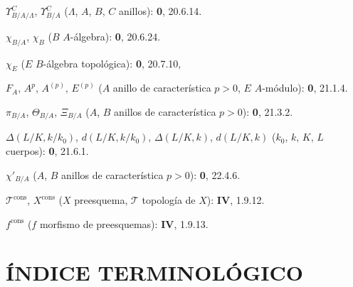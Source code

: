 \clearpage
{}
$\Upsilon^C_{B/A/\Lambda}$, $\Upsilon^C_{B/A}$ ($\Lambda$, $A$, $B$, $C$ anillos): \textbf{0}, 20.6.14.\par
$\chi_{B/A}$, $\chi_B$ ($B$ $A$-álgebra): \textbf{0}, 20.6.24.\par
$\chi_E$ ($E$ $B$-álgebra topológica): \textbf{0}, 20.7.10,\par
$F_A$, $A^p$, $A^{(p)}$, $E^{(p)}$ ($A$ anillo de característica $p>0$, $E$ $A$-módulo): \textbf{0}, 21.1.4.\par
$\pi_{B/A}$, $\Theta_{B/A}$, $\Xi_{B/A}$ ($A$, $B$ anillos de característica $p>0$): \textbf{0}, 21.3.2.\par
$\Delta(L/K,k/k_0)$, $d(L/K,k/k_0)$, $\Delta(L/K,k)$, $d(L/K,k)$ ($k_0$, $k$, $K$, $L$ cuerpos): \textbf{0}, 21.6.1.\par
$\chi'_{B/A}$ ($A$, $B$ anillos de característica $p>0$): \textbf{0}, 22.4.6.\par
$\mathscr T^{\mathrm{cons}}$, $X^{\mathrm{cons}}$ ($X$ preesquema, $\mathscr T$ topología de $X$): \textbf{IV}, 1.9.12.\par
$f^{\mathrm{cons}}$ ($f$ morfismo de preesquemas): \textbf{IV}, 1.9.13.\par

\clearpage
{}
{}
\section*{ÍNDICE TERMINOLÓGICO}

